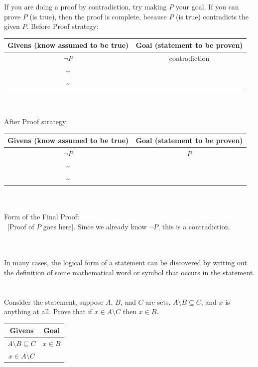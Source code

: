 \documentclass[../setup.tex]{subfiles}
\begin{document}
\begin{theorem}
	If you are doing a proof by contradiction, try making $P$ your goal. If you can prove $P$ (is true), then the proof is complete, bceause $P$ (is true) contradicts the given $P$.
	Before Proof strategy:
	\begin{center}
	\begin{tabular}[t]{| c | c |}
		\hline
		Givens (know assumed to be true) & Goal (statement to be proven) \\
		\hline
		$\lnot{P}$ & contradiction \\
		\textasciitilde & \\
		\textasciitilde & \\
		\hline
	\end{tabular}
	\end{center}
	\phantom \\ \\
	After Proof strategy:
	\begin{center}
	\begin{tabular}[t]{| c | c |}
		\hline
		Givens (know assumed to be true) & Goal (statement to be proven) \\
		\hline
		$\lnot{P}$ & $P$ \\
		\textasciitilde & \\
		\textasciitilde & \\
		\hline
	\end{tabular}
	\end{center}
	\phantom \\ \\
	Form of the Final Proof: \\
	\phantom \ [Proof of $P$ goes here]. Since we already know $\lnot P$, this is a contradiction.
\end{theorem}
\phantom \\ \\
In many cases, the logical form of a statement can be discovered by writing out the definition of some mathematical word or symbol that occurs in the statement. \\
\phantom \\ \\
Consider the statement, suppose $A$, $B$, and $C$ are sets, $A \setminus B \subseteq C$, and $x$ is anything at all. Prove that if $x \in A \setminus C$ then $x \in B$.
\begin{center}
	\begin{tabular}[t]{| c | c |}
		\hline
		Givens  & Goal  \\
		\hline
		$A \setminus B \subseteq C$ & $x \in B$ \\
		$x \in A \setminus C$ & \\
		\hline
	\end{tabular}
\end{center}
\end{document}
